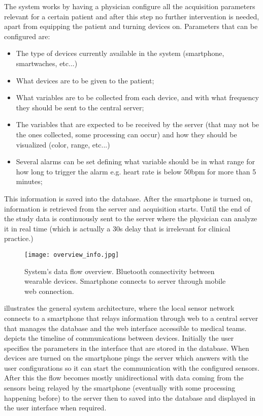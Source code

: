 The system works by having a physician configure all the acquisition parameters relevant for a certain patient and after this step no further intervention is needed, apart from equipping the patient and turning devices on. Parameters that can be configured are:
\begin{itemize}
	\item The type of devices currently available in the system (smartphone, smartwaches, etc...)
	\item What devices are to be given to the patient;
	\item What variables are to be collected from each device, and with what frequency they should be sent to the central server;
	\item The variables that are expected to be received by the server (that may not be the ones collected, some processing can occur) and how they should be visualized (color, range, etc...)
	\item Several alarms can be set defining what variable should be in what range for how long to trigger the alarm e.g. heart rate is below 50\ac{bpm} for more than 5 minutes;
\end{itemize}
This information is saved into the database. After the smartphone is turned on, information is retrieved from the server and acquisition starts. Until the end of the study data is continuously sent to the server where the physician can analyze it in real time (which is actually a 30s delay that is irrelevant for clinical practice.)

\begin{figure}[!h]
	\centering
	\texttt{[image: overview\_info.jpg]}
	\caption{System's data flow overview. Bluetooth connectivity between wearable devices. Smartphone connects to server through mobile web connection.}
	\label{fig:overview2}
\end{figure}


 illustrates the general system architecture, where the local sensor network connects to a smartphone that relays information through web to a central server that manages the database and the web interface accessible to medical teams.  depicts the timeline of communications between devices. Initially the user specifies the parameters in the interface that are stored in the database. When devices are turned on the smartphone pings the server which answers with the user configurations so it can start the communication with the configured sensors. After this the flow becomes mostly unidirectional with data coming from the sensors being relayed by the smartphone (eventually with some processing happening before) to the server then to saved into the database and displayed in the user interface when required.


